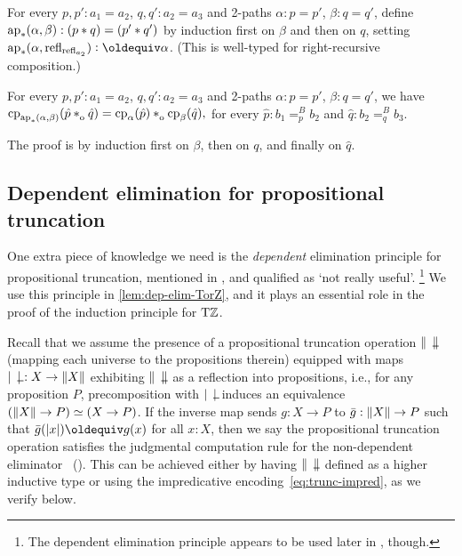 \documentclass[a4paper,12pt]{amsart}
\begin{document}
\begin{definition}\label{lem:compo-ap-ap}
  For every  $p,p':a_1=a_2$, $q,q':a_2=a_3$ and 2-paths
  $\alpha : p = p'$, $\beta : q = q'$, define
  $\mathop{\mathrm{ap}_{*}}(\alpha,\beta): (p* q)=(p'* q')$ by induction
  first on $\beta$ and then on $q$,
  setting $\apc(\alpha,\refl{\refl{a_2}}) \defeq \alpha$.
  (This is well-typed for right-recursive composition.)
\end{definition}

\begin{lemma}\label{lem:compo-change-path}
  For every  $p,p':a_1=a_2$, $q,q':a_2=a_3$ and 2-paths
  $\alpha : p = p'$, $\beta : q = q'$, we have
  $\cp{\apc(\alpha,\beta)}(\hat p \cto \hat q) =
   \cp{\alpha}(\hat p) \cto  \cp{\beta}(\hat q),$
  for every $\hat p: b_1=^B_p b_2$ and $\hat q: b_2=^B_q b_3$.
\end{lemma}
 The proof is by induction first on $\beta$, then on $q$, and finally on $\hat q$.

\subsection{Dependent elimination for propositional truncation}\label{sec:proptrunc}

One extra piece of knowledge we need is the \emph{dependent} elimination
principle for propositional truncation, mentioned in \cite[6.9]{hottbook},
and qualified as `not really useful'.%
\footnote{The dependent elimination principle appears to
  be used later in \cite[Lemma 7.3.3]{hottbook}, though.
}
We use this principle in \cref{lem:dep-elim-TorZ}, and it plays an
essential role in the proof of the induction principle for ${\mathrm{T}\mathbb{Z}}$.

Recall that we assume the presence of a propositional truncation operation
$\Trunc{\blank}$ (mapping each universe to the propositions therein) equipped with
maps $\trunc{\blank} : X \to \Trunc X$ exhibiting $\Trunc{\blank}$ as a reflection into
propositions, i.e., for any proposition $P$, precomposition with $\trunc{\blank}$
induces an equivalence $(\lVert X\rVert\to P) \simeq (X\to P)$.
If the inverse map sends $g:X\to P$ to $\bar g : \lVert X\rVert \to P$
such that $\bar g(\trunc x) \jdeq g(x)$ for all $x:X$,
then we say the propositional truncation operation satisfies the
judgmental computation rule for the non-dependent eliminator~%
().
This can be achieved either by having $\Trunc{\blank}$ defined as a higher inductive type
or using the impredicative encoding~\eqref{eq:trunc-impred}, as we verify below.
\end{document}
